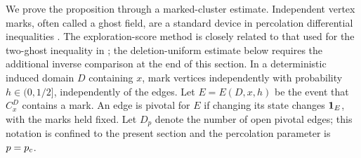 We prove the proposition through a marked-cluster estimate. Independent
vertex marks, often called a ghost field, are a standard device in
percolation differential inequalities \cite{AizenmanBarsky1987}.
The exploration-score method is closely related to that used for the
two-ghost inequality in \cite[Section~3]{Hutchcroft2020Locality};
the deletion-uniform estimate below requires the additional inverse
comparison at the end of this section. In a
deterministic induced domain $D$ containing $x$, mark vertices
independently with probability $h\in(0,1/2]$, independently of the
edges. Let $E=E(D,x,h)$ be the event that $C_x^D$ contains a mark.
An edge is pivotal for $E$ if changing its state changes $\mathbf 1_E$,
with the marks held fixed. Let $D_p$ denote the number of open
pivotal edges; this notation is confined to the present section and
the percolation parameter is $p={p_c}$.


